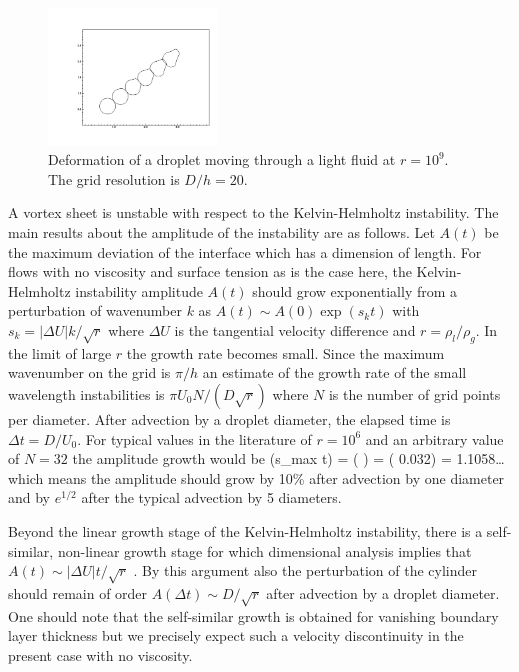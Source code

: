 \begin{figure}
\begin{center}
\includegraphics[width=0.4\textwidth]{Figures/Sagar/long.png}
\end{center}
\caption{Deformation of a droplet moving through a light fluid at $r=10^9$.
The grid resolution is $D/h=20$.}
\label{long}
\end{figure}
A vortex sheet is unstable with respect to the Kelvin-Helmholtz instability. 
The main results about the amplitude of the instability are as follows. 
Let $A(t)$ be the maximum deviation of the interface which has a dimension of length. 
For flows with no viscosity and surface tension
as is the case here, the  Kelvin-Helmholtz instability amplitude $A(t)$  should grow exponentially from a perturbation 
of wavenumber $k$ as $A(t) \sim A(0) \exp ( s_k t )$ with $s_k =| \Delta U | k/ \sqrt r  $ where $ \Delta U $ is
the tangential velocity difference and $r=\rho_l/\rho_g$. In the limit of large $r$ the growth rate becomes small. Since the maximum wavenumber on the grid is $\pi/h$ an estimate of the growth rate of the small wavelength instabilities is $\pi U_0 N/(D \sqrt r)$ where $N$ is the number of grid points per diameter. After advection by a droplet diameter, the 
elapsed time is $\Delta t = D/U_0$. For typical values in the literature of $r=10^6$ and an arbitrary value of 
$N=32$ the amplitude growth would be 
\be
\exp (s_{\rm max} \Delta t) =  \exp\left(  \right) 
= \exp ( 0.032\pi) = 1.1058\ldots
\nd
which means the amplitude should grow by 10\% after advection by one diameter 
and by $e^{1/2}$ after the typical advection by 5 diameters. 

Beyond the linear growth stage of the Kelvin-Helmholtz instability, there is a 
self-similar, non-linear growth stage for which dimensional analysis implies
that $A(t) \sim | \Delta U | t/ \sqrt r $ \cite{hoepffner11}. By this argument 
also the perturbation of the cylinder should remain  of order  
$A(\Delta t) \sim D / \sqrt r$ after advection by a droplet diameter. 
One should note that the self-similar growth is obtained for vanishing boundary 
layer thickness but we precisely expect such a velocity discontinuity in 
the present case with no viscosity. 

